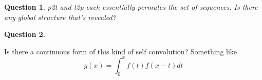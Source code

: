 \documentclass[10pt]{article}
\newtheorem{question}{Question}
\numberwithin{equation}{section}
\begin{document}
\begin{question}

p2t  and  t2p  each  essentially  permutes  the  set  of  sequences.   Is  there  any global structure that’s revealed?
\end{question}
\begin{question}

\end{question}
Is there a continuous form of this kind of self convolution? Something like
\begin{equation*}
    g(x) = \int_0^x f(t)f(x-t)dt
\end{equation*}
%
\end{document}
